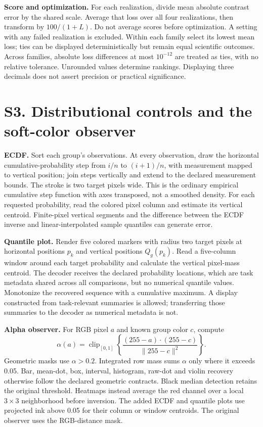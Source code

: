 \documentclass[10pt]{article}
\begin{document}
\textbf{Score and optimization.} For each realization, divide mean absolute contrast error by the shared scale. Average that loss over all four realizations, then transform by $100/(1+L)$. Do not average scores before optimization. A setting with any failed realization is excluded. Within each family select its lowest mean loss; ties can be displayed deterministically but remain equal scientific outcomes. Across families, absolute loss differences at most $10^{-12}$ are treated as ties, with no relative tolerance. Unrounded values determine rankings. Displaying three decimals does not assert precision or practical significance.


\section*{S3. Distributional controls and the soft-color observer}
\textbf{ECDF.} Sort each group's observations. At every observation, draw the horizontal cumulative-probability step from $i/n$ to $(i+1)/n$, with measurement mapped to vertical position; join steps vertically and extend to the declared measurement bounds. The stroke is two target pixels wide. This is the ordinary empirical cumulative step function with axes transposed, not a smoothed density. For each requested probability, read the colored pixel column and estimate its vertical centroid. Finite-pixel vertical segments and the difference between the ECDF inverse and linear-interpolated sample quantiles can generate error.

\textbf{Quantile plot.} Render five colored markers with radius two target pixels at horizontal positions $p_k$ and vertical positions $Q_g(p_k)$. Read a five-column window around each target probability and calculate the vertical pixel-mass centroid. The decoder receives the declared probability locations, which are task metadata shared across all comparisons, but no numerical quantile values. Monotonize the recovered sequence with a cumulative maximum. A display constructed from task-relevant summaries is allowed; transferring those summaries to the decoder as numerical metadata is not.

\textbf{Alpha observer.} For RGB pixel $a$ and known group color $c$, compute
\[
\alpha(a)=\operatorname{clip}_{[0,1]}\left\{\frac{(255-a)\cdot(255-c)}{\|255-c\|^2}\right\}.
\]
Geometric masks use $\alpha>0.2$. Integrated row mass sums $\alpha$ only where it exceeds 0.05. Bar, mean-dot, box, interval, histogram, raw-dot and violin recovery otherwise follow the declared geometric contracts. Black median detection retains the original threshold. Heatmaps instead average the red channel over a local $3\times3$ neighborhood before inversion. The added ECDF and quantile plots use projected ink above 0.05 for their column or window centroids. The original observer uses the RGB-distance mask.
\end{document}
